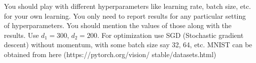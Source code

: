 \documentclass[a4paper]{article}
\theoremstyle{definition}
\begin{document}
You should play with different hyperparameters like learning rate, batch size, etc. for your own learning. You only need to report results for any particular setting of hyperparameters. You should mention the values of those along with the results. Use $d_1 = 300$, $d_2 = 200$. For optimization use SGD (Stochastic gradient descent) without momentum, with some batch size say 32, 64, etc. MNIST can be obtained from here (https://pytorch.org/vision/ stable/datasets.html)


\end{document}
